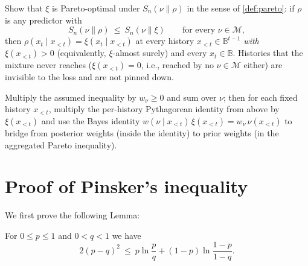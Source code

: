 \documentclass[fontsize=11pt, parskip=half]{scrartcl}
\renewcommand{\thesection}{\arabic{section}}
\newcommand{\Mc}{\mathcal{M}}
\newcommand{\Sn}[2]{S_{n}(#1 \parallel #2)}
\begin{document}
\begin{exercise}
\label{prob:sq_pareto}



Show that $\xi$ is Pareto-optimal under $\Sn{\nu}{\rho}$ in the sense of \cref{def:pareto}: if $\rho$ is any predictor with
\[
  \Sn{\nu}{\rho} ~\leq~ \Sn{\nu}{\xi} \qquad \text{for every } \nu \in \Mc,
\]
then $\rho(x_t \mid x_{<t}) = \xi(x_t \mid x_{<t})$ at every history $x_{<t} \in
\mathbb{B}^{t-1}$ \emph{with $\xi(x_{<t}) > 0$} (equivalently, $\xi$-almost
surely) and every $x_t \in \mathbb{B}$. Histories that the mixture never reaches
($\xi(x_{<t}) = 0$, i.e., reached by no $\nu \in \Mc$ either) are invisible
to the loss and are not pinned down.

\begin{hint}
Multiply the assumed inequality by $w_\nu \geq 0$ and sum over
$\nu$; then for each fixed history $x_{<t}$, multiply the per-history
Pythagorean identity from above by $\xi(x_{<t})$ and use the Bayes identity
$w(\nu \mid x_{<t})\,\xi(x_{<t}) = w_\nu \,\nu(x_{<t})$ to bridge from posterior
weights (inside the identity) to prior weights (in the aggregated Pareto
inequality).
\end{hint}
\end{exercise}


\clearpage
\appendix
\renewcommand{\thesection}{\Alph{section}}

\section{Proof of Pinsker's inequality}\label{app:pinsker}

We first prove the following Lemma:

\begin{lemma}\label{lem:pinsker_binary}
    For $0 \leq p \leq 1$ and $0 < q < 1$ we have
    \[
        2(p-q)^2 ~\leq~ p \ln \frac{p}{q} + (1-p) \ln \frac{1-p}{1-q}.
    \]
    \end{lemma}
    
    
    
    
\end{document}
